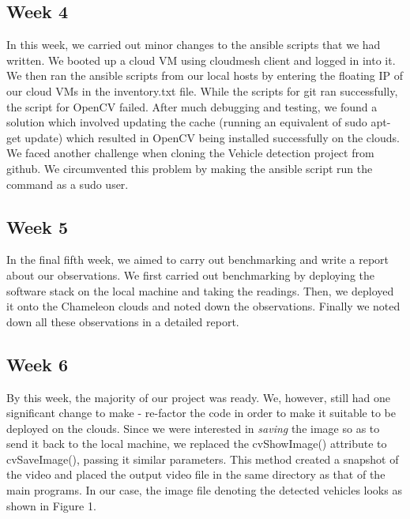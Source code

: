 \documentclass[9pt,twocolumn,twoside]{../../styles/osajnl}
\begin{document}
\subsection{Week 4}
In this week, we carried out minor changes to the ansible scripts that
we had written.  We booted up a cloud VM using cloudmesh client and
logged in into it.  We then ran the ansible scripts from our local
hosts by entering the floating IP of our cloud VMs in the
inventory.txt file.  While the scripts for git ran successfully, the
script for OpenCV failed.  After much debugging and testing, we found
a solution which involved updating the cache (running an equivalent of
sudo apt-get update) which resulted in OpenCV being installed
successfully on the clouds.  We faced another challenge when cloning
the Vehicle detection project from github.  We circumvented this
problem by making the ansible script run the command as a sudo user.

\subsection{Week 5}
In the final fifth week, we aimed to carry out benchmarking and write
a report about our observations.  We first carried out benchmarking by
deploying the software stack on the local machine and taking the
readings.  Then, we deployed it onto the Chameleon clouds and noted
down the observations.  Finally we noted down all these observations
in a detailed report.

\subsection{Week 6}
By this week, the majority of our project was ready.  We, however, still had one significant change to make - re-factor the code in order to make it suitable to be deployed on the clouds.  Since we were interested in \textit{saving} the image so as to send it back to the local machine, we replaced the cvShowImage() attribute to cvSaveImage(), passing it similar parameters.  This method created a snapshot of the video and placed the output video file in the same directory as that of the main programs.  In our case, the image file denoting the detected vehicles looks as shown in Figure 1.
\end{document}
